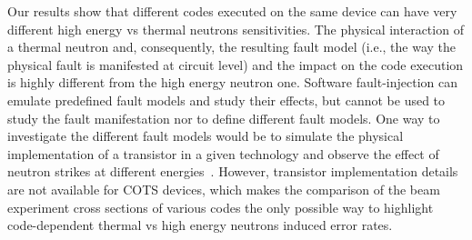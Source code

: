 Our results show that different codes executed on the same device can have very different high energy vs thermal neutrons sensitivities. 
The physical interaction of a thermal neutron and, consequently, the resulting fault model (i.e., the way the physical fault is manifested at circuit level) and the impact on the code execution is highly different from the high energy neutron one. 
Software fault-injection can emulate predefined fault models and study their effects, but cannot be used to study the fault manifestation nor to define different fault models. One way to investigate the different fault models would be to simulate the physical implementation of a transistor in a given technology and observe the effect of neutron strikes at different energies~\cite{Dodd2005}. However, transistor implementation details are not available for COTS devices, which makes the comparison of the beam experiment cross sections of various codes the only possible way to highlight code-dependent thermal vs high energy neutrons induced error rates.

